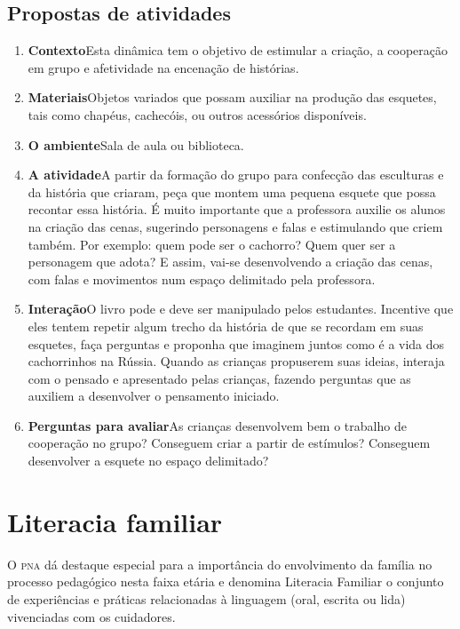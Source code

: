 \documentclass[11pt]{extarticle}
\begin{document}
\subsection{Propostas de atividades}



\begin{enumerate}
\item \textbf{Contexto}\quad Esta dinâmica tem o objetivo de estimular a criação, a cooperação em grupo e afetividade na encenação de histórias.

\item \textbf{Materiais}\quad Objetos variados que possam auxiliar na produção das esquetes, tais como chapéus, cachecóis, ou outros acessórios disponíveis. 

\item \textbf{O ambiente}\quad Sala de aula ou biblioteca. 

\item \textbf{A atividade}\quad A partir da formação do grupo para confecção das esculturas e da história que criaram, peça que montem uma pequena esquete que possa recontar essa história. É muito importante que a professora auxilie os alunos na criação das cenas, sugerindo personagens e falas e estimulando que criem também. Por exemplo: quem pode ser o cachorro? Quem quer ser a personagem que adota? E assim, vai-se desenvolvendo a criação das cenas, com falas e movimentos num espaço delimitado pela professora.

\item \textbf{Interação}\quad O livro pode e deve ser 
manipulado pelos estudantes. Incentive que eles tentem repetir algum trecho da história de que se recordam em suas esquetes,
faça perguntas e proponha que imaginem juntos como é a vida 
dos cachorrinhos na Rússia. Quando as crianças propuserem suas ideias, interaja com o pensado e apresentado pelas crianças, fazendo perguntas que as auxiliem a desenvolver o pensamento iniciado.

\item \textbf{Perguntas para avaliar}\quad As crianças desenvolvem bem o trabalho de cooperação no grupo? Conseguem criar a partir de estímulos? Conseguem desenvolver a esquete no espaço delimitado?
\end{enumerate}


\section{Literacia familiar}
O \textsc{pna} dá destaque especial para a importância do envolvimento da família 
no processo pedagógico nesta faixa etária e denomina Literacia Familiar o conjunto 
de experiências e práticas relacionadas à linguagem (oral, escrita ou lida) vivenciadas 
com os cuidadores. 
\end{document}
